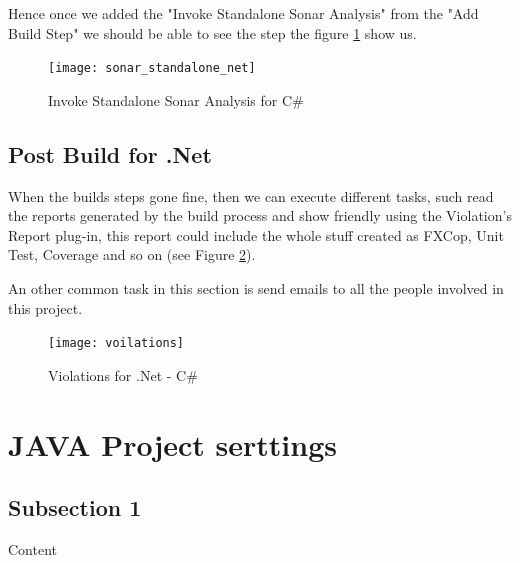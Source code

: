\documentclass[12pt]{article} %
\begin{document}
Hence once we added the "Invoke Standalone Sonar Analysis" from the "Add Build Step" we should be able to see the step the figure \ref{fig:sonar_standalone_net} show us.

 \begin{figure}[H] %
 	\center
	{\texttt{[image: sonar\_standalone\_net]}}
	\caption{Invoke Standalone Sonar Analysis for C\#}
	\label{fig:sonar_standalone_net}
\end{figure}

 \subsection{Post Build for .Net} %
 
When the builds steps gone fine, then we can execute different tasks, such read the reports generated by the build process and show friendly using the Violation's Report plug-in, this report could include the whole stuff created as FXCop, Unit Test, Coverage and so on (see Figure \ref{fig:voilations}).

An other common task in this section is send emails to all the people involved in this project.

 \begin{figure}[H] %
 	\center
	{\texttt{[image: voilations]}}
	\caption{Violations for .Net - C\#}
	\label{fig:voilations}
\end{figure}

\newpage
\section{JAVA Project serttings}

\subsection{Subsection 1} %

 Content



\end{document}

